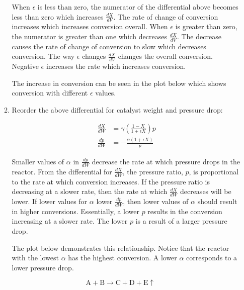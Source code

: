 \documentclass[12pt]{article}
\begin{document}
\begin{enumerate}
\begin{enumerate}
        When $\epsilon$ is less than zero, the numerator of the differential above becomes less than zero which increases $\frac{dX}{dV}$. The rate of change of conversion increases which increases conversion overall. When $\epsilon$ is greater than zero, the numerator is greater than one which decreases $\frac{dX}{dV}$. The decrease causes the rate of change of conversion to slow which decreases conversion. The way $\epsilon$ changes $\frac{dX}{dV}$ changes the overall conversion. Negative $\epsilon$ increases the rate which increases conversion.
    
        The increase in conversion can be seen in the plot below which shows conversion with different $\epsilon$ values.
    
        

        \item

        Reorder the above differential for catalyst weight and pressure drop:

        \begin{align*}
            \frac{dX}{dW} &= \gamma \left(\frac{1 - X}{1 + \epsilon X}\right) p \\
            \frac{dp}{dW} &= -\frac{\alpha (1 + \epsilon X)}{p}
        \end{align*}

        Smaller values of $\alpha$ in $\frac{dp}{dW}$ decrease the rate at which pressure drops in the reactor. From the differential for $\frac{dX}{dW}$, the pressure ratio, $p$, is proportional to the rate at which conversion increases. If the pressure ratio is decreasing at a slower rate, then the rate at which $\frac{dX}{dW}$ decreases will be lower. If lower values for $\alpha$ lower $\frac{dp}{dW}$, then lower values of $\alpha$ should result in higher conversions. Essentially, a lower $p$ results in the conversion increasing at a slower rate. The lower $p$ is a result of a larger pressure drop.

        The plot below demonstrates this relationship. Notice that the reactor with the lowest $\alpha$ has the highest conversion. A lower $\alpha$ corresponds to a lower pressure drop.

        

        
    \end{enumerate}

    
    

\newpage
    \[
        \mathrm{A} + \mathrm{B} \rightarrow \mathrm{C} + \mathrm{D} + \mathrm{E} \uparrow
    \]


\end{enumerate}
\end{document}
